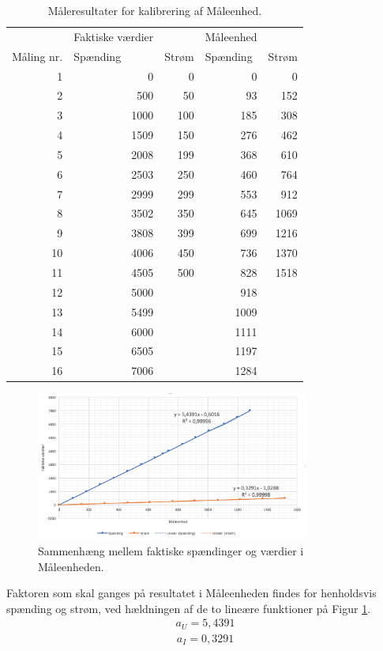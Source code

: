 \begin{table}[htbp]
	\centering
	\caption{Måleresultater for kalibrering af Måleenhed.}
	\begin{tabular}{rrrrr}
		\toprule
		& \multicolumn{1}{l}{Faktiske værdier} &       & \multicolumn{1}{l}{Måleenhed} &  \\
		\multicolumn{1}{l}{Måling nr. } & \multicolumn{1}{l}{Spænding} & \multicolumn{1}{l}{Strøm} & \multicolumn{1}{l}{Spænding } & \multicolumn{1}{l}{Strøm} \\
		\midrule
		1     & 0     & 0     & 0     & 0 \\
		2     & 500   & 50    & 93    & 152 \\
		3     & 1000  & 100   & 185   & 308 \\
		4     & 1509  & 150   & 276   & 462 \\
		5     & 2008  & 199   & 368   & 610 \\
		6     & 2503  & 250   & 460   & 764 \\
		7     & 2999  & 299   & 553   & 912 \\
		8     & 3502  & 350   & 645   & 1069 \\
		9     & 3808  & 399   & 699   & 1216 \\
		10    & 4006  & 450   & 736   & 1370 \\
		11    & 4505  & 500   & 828   & 1518 \\
		12    & 5000  &       & 918   &  \\
		13    & 5499  &       & 1009  &  \\
		14    & 6000  &       & 1111  &  \\
		15    & 6505  &       & 1197  &  \\
		16    & 7006  &       & 1284  &  \\
		\bottomrule
	\end{tabular}%
	\label{tab:MEkalibrering}%
\end{table}%

\begin{figure}[htbp]
	\centering
	\includegraphics[width=0.80\textwidth]{Figure/MEkalibreringgraf}
	\caption{Sammenhæng mellem faktiske spændinger og værdier i Måleenheden.}
	\label{fig:MEgraf}
\end{figure}

Faktoren som skal ganges på resultatet i Måleenheden findes for henholdsvis spænding og strøm, ved hældningen af de to lineære funktioner på Figur \ref{fig:MEgraf}.
\begin{align}
	a_{U} = 5,4391
\end{align}
\begin{align}
a_{I} = 0,3291
\end{align}